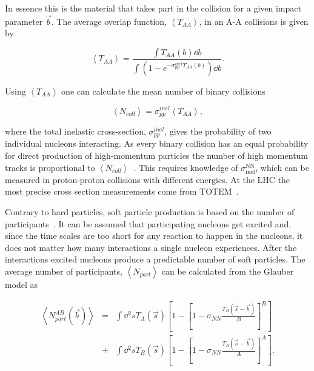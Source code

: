 \noindent In essence this is the material that takes part in the collision for a given impact parameter $\vec b$. The average overlap function, $\left<T_{AA}\right>$, in an A-A collisions  is given by~\cite{Afanasiev:2009aa}

\begin{equation}
\left<T_{AA}\right>=\frac{\int T_{AA}\left(b\right) \dd b}
{\int\left(1-e^{-\sigma^{inel}_{pp}T_{AA}\left(b\right)}\right)\dd b}.
\end{equation}

\noindent Using $\left<T_{AA}\right>$ one can calculate the mean number of binary collisions

\begin{equation}
\left<N_{coll}\right>=\sigma_{pp}^{inel}\left<T_{AA}\right>,
\end{equation}

\noindent where the total inelastic cross-section, $\sigma_{pp}^{inel}$, gives the probability of two individual nucleons interacting. As every binary collision has an equal probability for direct production of high-momentum particles the number of high momentum tracks is proportional to $\left<N_{coll}\right>$~\cite{Abelev:2013qoq,Kharzeev:2004if,Deng:2010mv}. This requires knowledge of $\sigma\mathrm{^{NN}_{inel}}$, which can be measured in proton-proton collisions with different energies. At the LHC the most precise cross section measurements come from TOTEM~\cite{Antchev:2017dia}.

Contrary to hard particles, soft particle production is based on the number of participants~\cite{Kharzeev:2004if}. It can be assumed that participating nucleons get excited and, since the time scales are too short for any reaction to happen in the nucleons, it does not matter how many interactions a single nucleon experiences. After the interactions excited nucleons produce a predictable number of soft particles. The average number of participants, $\left<N_{part}\right>$ can be calculated from the Glauber model  as


\begin{eqnarray}
\left<N_{part}^{AB}\left(\vec b\right)\right>&=&\int \dd{^2s} T_A\left(\vec s\right)\left[1-\left[1-\sigma_{NN}\frac{T_B\left(\vec s - \vec b\right)}{B}\right]^B\right] \nonumber \\
 &+ &\int \dd{^2 s} T_B\left(\vec s\right)\left[1-\left[1-\sigma_{NN}\frac{T_A\left(\vec s - \vec b\right)}{A}\right]^A\right].
\end{eqnarray}



